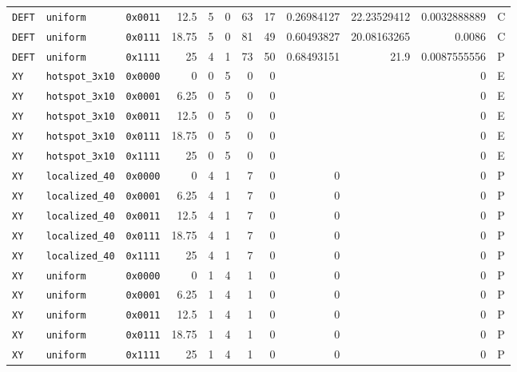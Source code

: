 \documentclass[conference]{IEEEtran}
\begin{document}
\begin{table}[t]
\begin{adjustbox}{max width=\textwidth}
\begin{tabular}{@{}lllrrrrrrrrl@{}}
\texttt{DEFT} & \texttt{uniform} & \texttt{0x0011} & 12.5 & 5 & 0 & 63 & 17 & 0.26984127 & 22.23529412 & 0.0032888889 & C \\
\texttt{DEFT} & \texttt{uniform} & \texttt{0x0111} & 18.75 & 5 & 0 & 81 & 49 & 0.60493827 & 20.08163265 & 0.0086 & C \\
\texttt{DEFT} & \texttt{uniform} & \texttt{0x1111} & 25 & 4 & 1 & 73 & 50 & 0.68493151 & 21.9 & 0.0087555556 & P \\
\texttt{XY} & \texttt{hotspot\_3x10} & \texttt{0x0000} & 0 & 0 & 5 & 0 & 0 & & & 0 & E \\
\texttt{XY} & \texttt{hotspot\_3x10} & \texttt{0x0001} & 6.25 & 0 & 5 & 0 & 0 & & & 0 & E \\
\texttt{XY} & \texttt{hotspot\_3x10} & \texttt{0x0011} & 12.5 & 0 & 5 & 0 & 0 & & & 0 & E \\
\texttt{XY} & \texttt{hotspot\_3x10} & \texttt{0x0111} & 18.75 & 0 & 5 & 0 & 0 & & & 0 & E \\
\texttt{XY} & \texttt{hotspot\_3x10} & \texttt{0x1111} & 25 & 0 & 5 & 0 & 0 & & & 0 & E \\
\texttt{XY} & \texttt{localized\_40} & \texttt{0x0000} & 0 & 4 & 1 & 7 & 0 & 0 & & 0 & P \\
\texttt{XY} & \texttt{localized\_40} & \texttt{0x0001} & 6.25 & 4 & 1 & 7 & 0 & 0 & & 0 & P \\
\texttt{XY} & \texttt{localized\_40} & \texttt{0x0011} & 12.5 & 4 & 1 & 7 & 0 & 0 & & 0 & P \\
\texttt{XY} & \texttt{localized\_40} & \texttt{0x0111} & 18.75 & 4 & 1 & 7 & 0 & 0 & & 0 & P \\
\texttt{XY} & \texttt{localized\_40} & \texttt{0x1111} & 25 & 4 & 1 & 7 & 0 & 0 & & 0 & P \\
\texttt{XY} & \texttt{uniform} & \texttt{0x0000} & 0 & 1 & 4 & 1 & 0 & 0 & & 0 & P \\
\texttt{XY} & \texttt{uniform} & \texttt{0x0001} & 6.25 & 1 & 4 & 1 & 0 & 0 & & 0 & P \\
\texttt{XY} & \texttt{uniform} & \texttt{0x0011} & 12.5 & 1 & 4 & 1 & 0 & 0 & & 0 & P \\
\texttt{XY} & \texttt{uniform} & \texttt{0x0111} & 18.75 & 1 & 4 & 1 & 0 & 0 & & 0 & P \\
\texttt{XY} & \texttt{uniform} & \texttt{0x1111} & 25 & 1 & 4 & 1 & 0 & 0 & & 0 & P \\
\bottomrule
\end{tabular}
\end{adjustbox}
\end{table}
\end{document}
